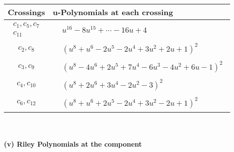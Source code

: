 \documentclass[1p]{elsarticle_modified}
\theoremstyle{definition}
\begin{document}
\begin{tabular}{m{50pt}|m{274pt}}
Crossings & \hspace{64pt}u-Polynomials at each crossing \\
\hline $$\begin{aligned}c_{1},c_{5},c_{7}\\c_{11}\end{aligned}$$&$\begin{aligned}
&u^{16}-8 u^{15}+\cdots-16 u+4
\end{aligned}$\\
\hline $$\begin{aligned}c_{2},c_{8}\end{aligned}$$&$\begin{aligned}
&(u^8+u^6-2 u^5-2 u^4+3 u^2+2 u+1)^2
\end{aligned}$\\
\hline $$\begin{aligned}c_{3},c_{9}\end{aligned}$$&$\begin{aligned}
&(u^8-4 u^6+2 u^5+7 u^4-6 u^3-4 u^2+6 u-1)^2
\end{aligned}$\\
\hline $$\begin{aligned}c_{4},c_{10}\end{aligned}$$&$\begin{aligned}
&(u^8+2 u^6+3 u^4-2 u^2-3)^2
\end{aligned}$\\
\hline $$\begin{aligned}c_{6},c_{12}\end{aligned}$$&$\begin{aligned}
&(u^8+u^6+2 u^5-2 u^4+3 u^2-2 u+1)^2
\end{aligned}$\\
\hline
\end{tabular}\\~\\
\newpage\renewcommand{\arraystretch}{1}
\flushleft \textbf{(v) Riley Polynomials at the component}\newline \\
\end{document}
